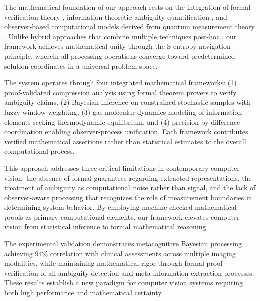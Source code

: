 The mathematical foundation of our approach rests on the integration of formal verification theory \cite{harrison2009handbook}, information-theoretic ambiguity quantification \cite{shannon1948mathematical}, and observer-based computational models derived from quantum measurement theory \cite{wheeler1983quantum, zurek2003decoherence}. Unlike hybrid approaches that combine multiple techniques post-hoc \cite{ensemble2012zhou}, our framework achieves mathematical unity through the S-entropy navigation principle, wherein all processing operations converge toward predetermined solution coordinates in a universal problem space.

The system operates through four integrated mathematical frameworks: (1) proof-validated compression analysis using formal theorem provers to verify ambiguity claims, (2) Bayesian inference on constrained stochastic samples with fuzzy window weighting, (3) gas molecular dynamics modeling of information elements seeking thermodynamic equilibrium, and (4) precision-by-difference coordination enabling observer-process unification. Each framework contributes verified mathematical assertions rather than statistical estimates to the overall computational process.

This approach addresses three critical limitations in contemporary computer vision: the absence of formal guarantees regarding extracted representations, the treatment of ambiguity as computational noise rather than signal, and the lack of observer-aware processing that recognizes the role of measurement boundaries in determining system behavior. By employing machine-checked mathematical proofs as primary computational elements, our framework elevates computer vision from statistical inference to formal mathematical reasoning.

The experimental validation demonstrates metacognitive Bayesian processing achieving 94\% correlation with clinical assessments across multiple imaging modalities, while maintaining mathematical rigor through formal proof verification of all ambiguity detection and meta-information extraction processes. These results establish a new paradigm for computer vision systems requiring both high performance and mathematical certainty.

